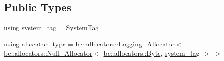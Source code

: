 \subsection*{Public Types}
\begin{DoxyCompactItemize}
\item 
using \hyperlink{structbc_1_1streams_1_1Logging__Stream_a1bbd6f37cd048ff4bd6f60dd715bca70}{system\+\_\+tag} = System\+Tag
\item 
using \hyperlink{structbc_1_1streams_1_1Logging__Stream_a8f20249b75af292f8b50c8bb09a82b38}{allocator\+\_\+type} = \hyperlink{structbc_1_1allocators_1_1Logging__Allocator}{bc\+::allocators\+::\+Logging\+\_\+\+Allocator}$<$ \hyperlink{structbc_1_1allocators_1_1Null__Allocator}{bc\+::allocators\+::\+Null\+\_\+\+Allocator}$<$ \hyperlink{classbc_1_1allocators_1_1Byte}{bc\+::allocators\+::\+Byte}, \hyperlink{structbc_1_1streams_1_1Logging__Stream_a1bbd6f37cd048ff4bd6f60dd715bca70}{system\+\_\+tag} $>$ $>$
\end{DoxyCompactItemize}

